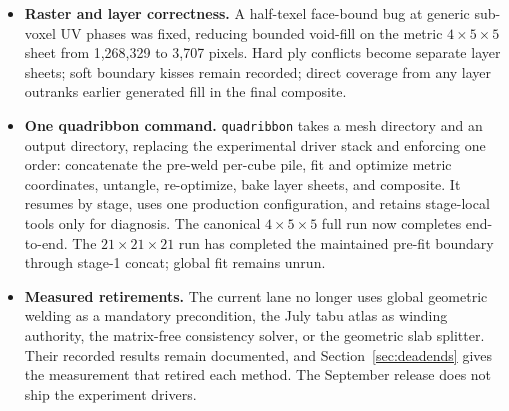 \begin{revision}
{\begin{itemize}
  \item \textbf{Raster and layer correctness.} A half-texel face-bound bug at generic sub-voxel UV phases was fixed, reducing bounded void-fill on the metric $4\times5\times5$ sheet from 1,268,329 to 3,707 pixels. Hard ply conflicts become separate layer sheets; soft boundary kisses remain recorded; direct coverage from any layer outranks earlier generated fill in the final composite.

  \item \textbf{One quadribbon command.} \texttt{quadribbon} takes a mesh directory and an output directory, replacing the experimental driver stack and enforcing one order: concatenate the pre-weld per-cube pile, fit and optimize metric coordinates, untangle, re-optimize, bake layer sheets, and composite. It resumes by stage, uses one production configuration, and retains stage-local tools only for diagnosis. The canonical $4\times5\times5$ full run now completes end-to-end. The $21\times21\times21$ run has completed the maintained pre-fit boundary through stage-1 concat; global fit remains unrun.

  \item \textbf{Measured retirements.} The current lane no longer uses global geometric welding as a mandatory precondition, the July tabu atlas as winding authority, the matrix-free consistency solver, or the geometric slab splitter. Their recorded results remain documented, and Section~\ref{sec:deadends} gives the measurement that retired each method. The September release does not ship the experiment drivers.
\end{itemize}
}
\end{revision}
